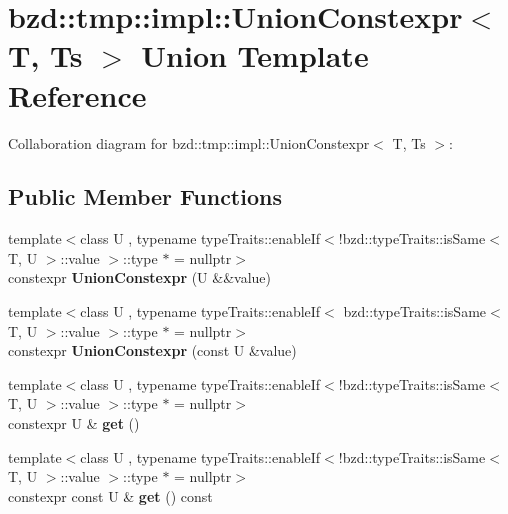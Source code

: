 \hypertarget{unionbzd_1_1tmp_1_1impl_1_1UnionConstexpr}{}\section{bzd\+:\+:tmp\+:\+:impl\+:\+:Union\+Constexpr$<$ T, Ts $>$ Union Template Reference}
\label{unionbzd_1_1tmp_1_1impl_1_1UnionConstexpr}


Collaboration diagram for bzd\+:\+:tmp\+:\+:impl\+:\+:Union\+Constexpr$<$ T, Ts $>$\+:
\subsection*{Public Member Functions}
\begin{DoxyCompactItemize}
\item 
\mbox{\label{unionbzd_1_1tmp_1_1impl_1_1UnionConstexpr_a8464d93ab13892bb3152bb541809743e}} 
{\footnotesize template$<$class U , typename type\+Traits\+::enable\+If$<$!bzd\+::type\+Traits\+::is\+Same$<$ T, U $>$\+::value $>$\+::type $\ast$  = nullptr$>$ }\\constexpr {\bfseries Union\+Constexpr} (U \&\&value)
\item 
\mbox{\label{unionbzd_1_1tmp_1_1impl_1_1UnionConstexpr_ad0637f663adcff9df5f37af158b50eb6}} 
{\footnotesize template$<$class U , typename type\+Traits\+::enable\+If$<$ bzd\+::type\+Traits\+::is\+Same$<$ T, U $>$\+::value $>$\+::type $\ast$  = nullptr$>$ }\\constexpr {\bfseries Union\+Constexpr} (const U \&value)
\item 
\mbox{\label{unionbzd_1_1tmp_1_1impl_1_1UnionConstexpr_a4d6d4b30a5bc9f1cd58a07254dd57b4d}} 
{\footnotesize template$<$class U , typename type\+Traits\+::enable\+If$<$!bzd\+::type\+Traits\+::is\+Same$<$ T, U $>$\+::value $>$\+::type $\ast$  = nullptr$>$ }\\constexpr U \& {\bfseries get} ()
\item 
\mbox{\label{unionbzd_1_1tmp_1_1impl_1_1UnionConstexpr_a32da9f21eb5119dc07b78aafd7484015}} 
{\footnotesize template$<$class U , typename type\+Traits\+::enable\+If$<$!bzd\+::type\+Traits\+::is\+Same$<$ T, U $>$\+::value $>$\+::type $\ast$  = nullptr$>$ }\\constexpr const U \& {\bfseries get} () const

\end{DoxyCompactItemize}
